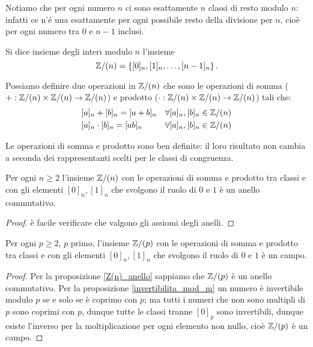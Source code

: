 Notiamo che per ogni numero $n$ ci sono esattamente $n$ classi di resto modulo $n$: infatti ce n'é una esattamente per ogni possibile resto della divisione per $n$, cioè per ogni numero tra $0$ e $n-1$ inclusi.

\begin{definition}
    Si dice insieme degli interi modulo $n$ l'insieme
    \begin{equation}
        \mathbb{Z}/(n) = \left\{ [0]_n, [1]_n, \dots, [n-1]_n\right\}.
    \end{equation}
\end{definition}

Possiamo definire due operazioni in $\Z/(n)$ che sono le operazioni di somma ($+ : \mathbb{Z}/(n) \times \mathbb{Z}/(n) \to \mathbb{Z}/(n)$) e prodotto ($\cdot : \mathbb{Z}/(n) \times \mathbb{Z}/(n) \to \mathbb{Z}/(n)$) tali che:
\begin{align}
    &[a]_n + [b]_n = [a+b]_n    &\forall [a]_n, [b]_n \in \mathbb{Z}/(n)\\
    &[a]_n \cdot [b]_n = [ab]_n &\forall [a]_n, [b]_n \in \mathbb{Z}/(n)
\end{align}

\begin{remark}
    Le operazioni di somma e prodotto sono ben definite: il loro risultato non cambia a seconda dei rappresentanti scelti per le classi di congruenza.
\end{remark}

\begin{proposition}[$\Z/(n)$ è un anello]\label{Z(n)_anello}
    Per ogni $n \geq 2$ l'insieme $\Z/(n)$ con le operazioni di somma e prodotto tra classi e con gli elementi $[0]_n, [1]_n$ che svolgono il ruolo di $0$ e $1$ è un anello commutativo.
\end{proposition}
\begin{proof}
    è facile verificare che valgono gli assiomi degli anelli.
\end{proof}

\begin{proposition}[$\Z/(p)$ è un anello]
    Per ogni $p \geq 2$, $p$ primo, l'insieme $\Z/(p)$ con le operazioni di somma e prodotto tra classi e con gli elementi $[0]_n, [1]_n$ che svolgono il ruolo di $0$ e $1$ è un campo.
\end{proposition}
\begin{proof}
    Per la proposizione \ref{Z(n)_anello} sappiamo che $\Z/(p)$ è un anello commutativo. Per la proposizione \ref{invertibilita_mod_m} un numero è invertibile modulo $p$ se e solo se è coprimo con $p$; ma tutti i numeri che non sono multipli di $p$ sono coprimi con $p$, dunque tutte le classi tranne $[0]_p$ sono invertibili, dunque esiste l'inverso per la moltiplicazione per ogni elemento non nullo, cioè $\Z/(p)$ è un campo.
\end{proof}

